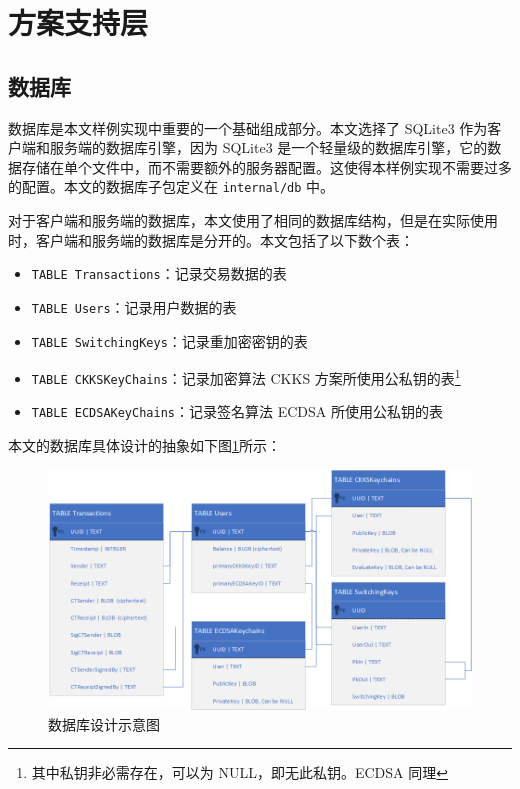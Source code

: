 \section{方案支持层}

\subsection{数据库}

数据库是本文样例实现中重要的一个基础组成部分。本文选择了 SQLite3 作为客户端和服务端的数据库引擎，因为 SQLite3 是一个轻量级的数据库引擎，它的数据存储在单个文件中，而不需要额外的服务器配置。这使得本样例实现不需要过多的配置。本文的数据库子包定义在 \verb|internal/db| 中。

对于客户端和服务端的数据库，本文使用了相同的数据库结构，但是在实际使用时，客户端和服务端的数据库是分开的。本文包括了以下数个表：

\begin{itemize}
    \item \verb|TABLE Transactions|：记录交易数据的表
    \item \verb|TABLE Users|：记录用户数据的表
    \item \verb|TABLE SwitchingKeys|：记录重加密密钥的表
    \item \verb|TABLE CKKSKeyChains|：记录加密算法 CKKS 方案所使用公私钥的表\footnote{其中私钥非必需存在，可以为 NULL，即无此私钥。ECDSA 同理}
    \item \verb|TABLE ECDSAKeyChains|：记录签名算法 ECDSA 所使用公私钥的表
\end{itemize}

本文的数据库具体设计的抽象如下图\ref*{Fig:Database}所示：

\begin{figure}[ht]
    \centering
    \includegraphics[width=0.8\linewidth]{Figures/chimata-database-design.png}
    \caption{数据库设计示意图}\label{Fig:Database}
\end{figure}

